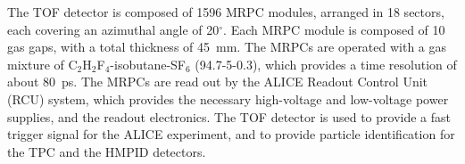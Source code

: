 The TOF detector is composed of 1596 MRPC modules, arranged in 18 sectors, each covering an azimuthal angle of 20$^\circ$. Each MRPC module is composed of 10 gas gaps, with a total thickness of 45~mm. The MRPCs are operated with a gas mixture of C$_2$H$_2$F$_4$-isobutane-SF$_6$ (94.7-5-0.3), which provides a time resolution of about 80~ps. The MRPCs are read out by the ALICE Readout Control Unit (RCU) system, which provides the necessary high-voltage and low-voltage power supplies, and the readout electronics. The TOF detector is used to provide a fast trigger signal for the ALICE experiment, and to provide particle identification for the TPC and the HMPID detectors. 

